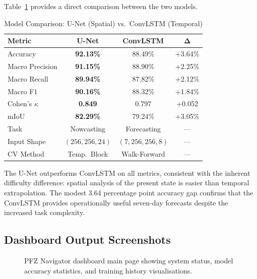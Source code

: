 \documentclass[conference]{IEEEtran}
\begin{document}
Table~\ref{tab:comparison} provides a direct comparison between the
two models.

\begin{table}[htbp]
\caption{Model Comparison: U-Net (Spatial) vs.\ ConvLSTM (Temporal)}
\label{tab:comparison}
\centering
\footnotesize
\begin{tabular}{lccc}
\toprule
\textbf{Metric} & \textbf{U-Net} & \textbf{ConvLSTM} & $\boldsymbol{\Delta}$\\
\midrule
Accuracy           & \textbf{92.13\%} & 88.49\% & +3.64\%\\
Macro Precision    & \textbf{91.15\%} & 88.90\% & +2.25\%\\
Macro Recall       & \textbf{89.94\%} & 87.82\% & +2.12\%\\
Macro F1           & \textbf{90.16\%} & 88.32\% & +1.84\%\\
Cohen's $\kappa$   & \textbf{0.849}   & 0.797   & +0.052\\
mIoU               & \textbf{82.29\%} & 79.24\% & +3.05\%\\
\midrule
Task               & Nowcasting  & Forecasting & ---\\
Input Shape        & $(256,256,24)$ & $(7,256,256,8)$ & ---\\
CV Method          & Temp.\ Block & Walk-Forward & ---\\
\bottomrule
\end{tabular}
\end{table}

The U-Net outperforms ConvLSTM on all metrics, consistent with
the inherent difficulty difference: spatial analysis of the present
state is easier than temporal extrapolation. The modest 3.64
percentage point accuracy gap confirms that the ConvLSTM provides
operationally useful seven-day forecasts despite the increased task
complexity.

\subsection{Dashboard Output Screenshots}

\begin{figure}[htbp]
\centering
\caption{PFZ Navigator dashboard main page showing system status,
model accuracy statistics, and training history visualisations.}
\label{fig:dashboard}
\end{figure}
\end{document}
